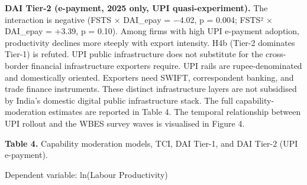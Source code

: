 \documentclass[
  12pt]{article}
\begin{document}
\textbf{DAI Tier-2 (e-payment, 2025 only, UPI quasi-experiment).} The
interaction is negative (FSTS × DAI\_epay = −4.02, p = 0.004; FSTS² ×
DAI\_epay = +3.39, p = 0.10). Among firms with high UPI e-payment
adoption, productivity declines more steeply with export intensity. H4b
(Tier-2 dominates Tier-1) is refuted. UPI public infrastructure does not
substitute for the cross-border financial infrastructure exporters
require. UPI rails are rupee-denominated and domestically oriented.
Exporters need SWIFT, correspondent banking, and trade finance
instruments. These distinct infrastructure layers are not subsidised by
India's domestic digital public infrastructure stack. The full
capability-moderation estimates are reported in Table 4. The temporal
relationship between UPI rollout and the WBES survey waves is visualised
in Figure 4.

\textbf{Table 4.} Capability moderation models, TCI, DAI Tier-1, and DAI
Tier-2 (UPI e-payment).

Dependent variable: ln(Labour Productivity)
\end{document}
